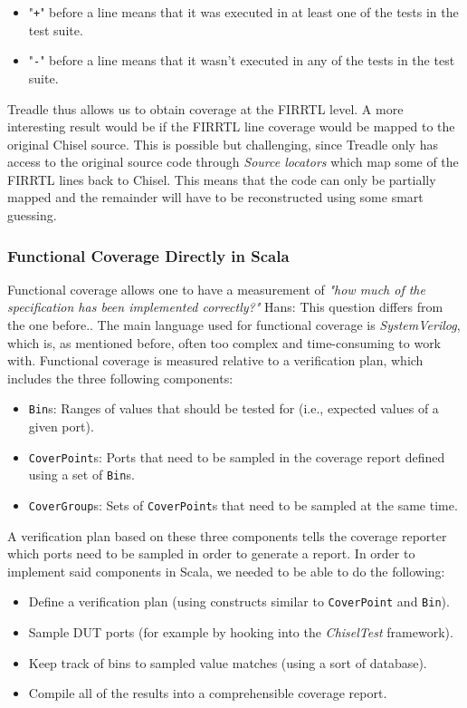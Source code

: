 \documentclass[conference]{IEEEtran}
\newcommand{\hjd}[1]{{\color{pink} Hans: #1}}
\begin{document}
\begin{itemize}
  \item "\texttt{+}" before a line means that it was executed in at least one of the tests in the test suite.
  \item "\texttt{-}" before a line means that it wasn't executed in any of the tests in the test suite.
\end{itemize}

Treadle thus allows us to obtain coverage at the FIRRTL level. A more interesting result would be if the FIRRTL line coverage would be mapped to the original Chisel source. This is possible but challenging, since Treadle only has access to the original source code through \textit{Source locators} which map some of the FIRRTL lines back to Chisel. This means that the code can only be partially mapped and the remainder will have to be reconstructed using some smart guessing.

\subsubsection{Functional Coverage Directly in Scala}
Functional coverage allows one to have a measurement of \textit{"how much of the specification has been implemented correctly?"} \hjd{This question differs from the one before.}. The main language used for functional coverage is \textit{SystemVerilog}, which is, as mentioned before, often too complex and time-consuming to work with. Functional coverage is measured relative to a verification plan, which includes the three following components:

\begin{itemize}
  \item \texttt{Bin}s: Ranges of values that should be tested for (i.e., expected values of a given port).
  \item \texttt{CoverPoint}s: Ports that need to be sampled in the coverage report defined using a set of \texttt{Bin}s.
  \item \texttt{CoverGroup}s: Sets of \texttt{CoverPoint}s that need to be sampled at the same time.
\end{itemize}

A verification plan based on these three components tells the coverage reporter which ports need to be sampled in order to generate a report. In order to implement said components in Scala, we needed to be able to do the following:

\begin{itemize}
  \item Define a verification plan (using constructs similar to \texttt{CoverPoint} and \texttt{Bin}).
  \item Sample DUT ports (for example by hooking into the \textit{ChiselTest} framework).
  \item Keep track of bins to sampled value matches (using a sort of database).
  \item Compile all of the results into a comprehensible coverage report.
\end{itemize}
\end{document}
